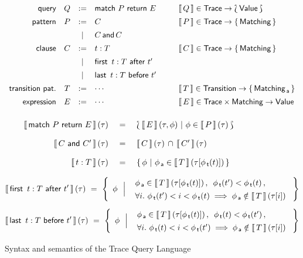 
\begin{figure}[p]
\hrulefill
\centering
\begin{equation*}\label{tql-syntax}
  \arraycolsep=5pt
  \def\arraystretch{1.4}
  \begin{array}{rcclcl}
    \m{query} & Q & := & 
    \MatchRet{\TracePat}{E} \ \, 
    & \ &  \Sem{Q} \in \Trace \to \Bag{\Value} \\
    \m{pattern} & \TracePat & := & C
    & & \Sem{\TracePat} \in \Trace \to \Set{\Matching} \\
    &  & | &  C \,\textsf{and}\, C \\
    \m{clause} & C & := & t:\TransPat
     &  & \Sem{C} \in \Trace \to \Set{\Matching} \\
     &  & | & \FirstAfter{t:\TransPat}{t'} \\
     &  & | & \LastBefore{t:\TransPat}{t'} \\
    \m{transition pat.} &  \TransPat & := & \cdots  %
     & & \Sem{\TransPat} \in \Transition \to \Set{\Matching_{\Ag}}  \\
    \m{expression} & E & := & \cdots
     & & \Sem{E} \in \Trace \times \Matching \to \Value \\
  \end{array}
\end{equation*}
\smallskip
\begin{equation*}
    \def\arraystretch{1.9}
    \begin{array}{rcl}
     \Sem{\MatchRet{\TracePat}{E}}(\tau) & \ = \ &
     \BagC{\Sem{E}(\tau, \phi)}{\phi \in \Sem{\TracePat}(\tau)} \\
     \Sem{C \m{ and } C'}(\tau) & = & 
     \Sem{C}(\tau) \Inter \Sem{C'}(\tau) \\
     \Sem{ t : T }(\tau) & = & 
     \SetC{\phi}{\phi_{\Ag} \in \Sem{T}(\At{\tau}{\phi_{\Tr}(t)})} \\
  \end{array}
\end{equation*}
\smallskip
\[
 \Sem{ \FirstAfter{t:\TransPat}{t'} }(\tau)  \ = \  
     \LargeMultilineSetC{\phi}{
       \phi_{\Ag} \in \Sem{\TransPat}(\At{\tau}{\phi_{\Tr}(t)}) \,,\ 
         \, \phi_{\Tr}(t') < \phi_{\Tr}(t) \,, }{
       \forall i. \ \phi_{\Tr}(t') < i < \phi_{\Tr}(t) \implies
       \phi_{\Ag} \notin \Sem{\TransPat}(\At{\tau}{i})
     }
\]
\[
 \Sem{ \LastBefore{t:\TransPat}{t'} }(\tau)  \ = \
     \LargeMultilineSetC{\phi}{
       \phi_{\Ag} \in \Sem{\TransPat}(\At{\tau}{\phi_{\Tr}(t)}) \,,\ 
       \, \phi_{\Tr}(t) < \phi_{\Tr}(t') \,, }{
       \forall i. \ \phi_{\Tr}(t) < i < \phi_{\Tr}(t') \implies
       \phi_{\Ag} \notin \Sem{\TransPat}(\At{\tau}{i})
     }
\]

\medskip
\hrulefill
\smallskip

\caption{Syntax and semantics of the Trace Query Language}
\label{fig:semantics}
\end{figure}